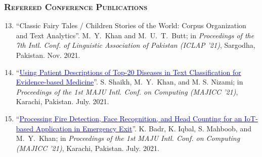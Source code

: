 \documentclass[a4paper, 10pt]{article}
\begin{document}
\subsubsection*{\textsc{Refereed Conference Publications}}
\begin{enumerate}
\setcounter{enumi}{12}
\itemsep-4pt






\item ``Classic Fairy Tales / Children Stories of the World: Corpus Organization and Text Analytics''. \textcolor{NavyBlue}{M.~Y.~Khan} and M.~U.~T.~Butt; in \emph{Proceedings of the 7th Intl. Conf. of Linguistic Association of Pakistan (ICLAP '21)}, Sargodha, Pakistan. Nov. 2021. %

\item ``\href{https://ieeexplore.ieee.org/document/9526252}{\textcolor{blue}{Using Patient Descriptions of Top-20 Diseases in Text Classification for Evidence-based Medicine}}''. S. Shaikh, \textcolor{NavyBlue}{M.~Y.~Khan}, and M. S. Nizami; in \emph{Proceedings of the 1st MAJU Intl. Conf. on Computing (MAJICC '21)}, Karachi, Pakistan. July. 2021.

\item ``\href{https://ieeexplore.ieee.org/document/9526261}{\textcolor{blue}{Processing Fire Detection, Face Recognition, and Head Counting for an IoT-based Application in Emergency Exit}}''. K. Badr, K. Iqbal, S. Mahboob, and \textcolor{NavyBlue}{M.~Y.~Khan}; in \emph{Proceedings of the 1st MAJU Intl. Conf. on Computing (MAJICC '21)}, Karachi, Pakistan. July. 2021.


\end{enumerate}
\end{document}
